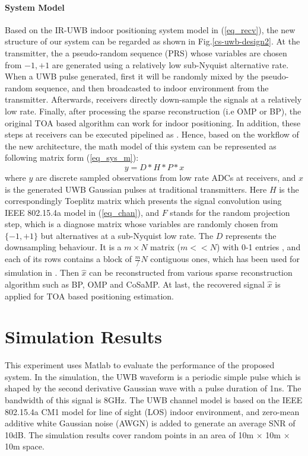 \paragraph{System Model}
Based on the IR-UWB indoor positioning system model in (\ref{eq_recv}), the new structure of our system can be regarded as shown in Fig.\ref{cs-uwb-design2}. At the transmitter, the a pseudo-random sequence (PRS) whose variables are chosen from ${-1,+1}$ are generated using a relatively low sub-Nyquist alternative rate. When a UWB pulse generated, first it will be randomly mixed by the pseudo-random sequence, and then broadcasted to indoor environment from the transmitter. Afterwards, receivers directly down-sample the signals at a relatively low rate. Finally, after processing the sparse reconstruction (i.e OMP or BP), the original TOA based algorithm can work for indoor positioning. In addition, these steps at receivers can be executed pipelined as \cite{yang2011compressive}. Hence, based on the workflow of the new architecture, the math model of this system can be represented as following matrix form (\ref{eq_sys_m}):
\begin{equation}
\label{eq_sys_m}
y = D * H * P * x
\end{equation}
where $y$ are discrete sampled observations from low rate ADCs at receivers, and $x$ is the generated UWB Gaussian pulses at traditional transmitters. Here $H$ is the correspondingly Toeplitz matrix which presents the signal convolution using IEEE 802.15.4a model in (\ref{eq_chan}), and $F$ stands for the random projection step, which is a diagnose matrix whose variables are randomly chosen from $\{-1,+1\}$ but alternatives at a sub-Nyquist low rate. The $D$ represents the downsampling behaviour. It is a $m\times N$ matrix ($m << N$) with 0-1 entries , and each of its rows contains a block of $\frac{m}/{N}$ contiguous ones, which has been used for simulation in \cite{tropp2010beyond}. Then $\hat x$ can be reconstructed from various sparse reconstruction algorithm such as BP, OMP and CoSaMP. At last, the recovered signal $\hat x$ is applied for TOA based positioning estimation.

\section{Simulation Results}
\indent \indent This experiment uses Matlab to evaluate the performance of the proposed system. In the simulation, the UWB waveform is a periodic simple pulse which is shaped by the second derivative Gaussian wave with a pulse duration of 1ns. The bandwidth of this signal is 8GHz. The UWB channel model is based on the IEEE 802.15.4a CM1 model for line of sight (LOS) indoor environment, and zero-mean additive white Gaussian noise (AWGN) is added to generate an average SNR of 10dB. The simulation results cover random points in an area of 10m $\times$ 10m $\times$ 10m space.

